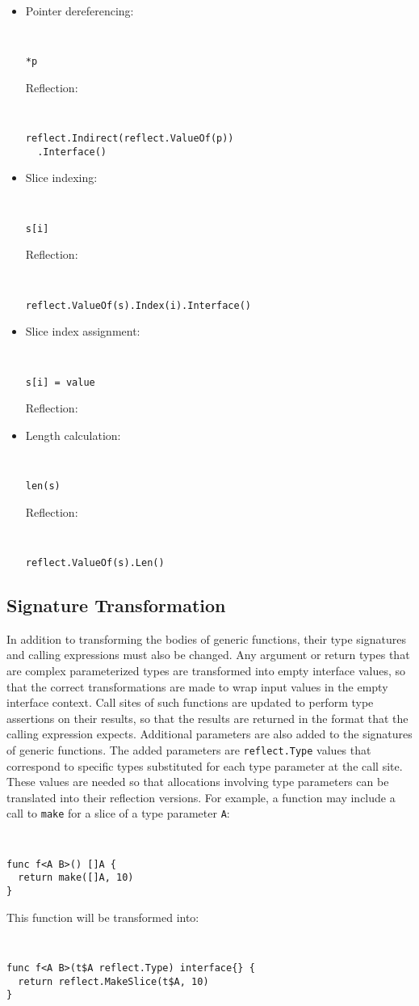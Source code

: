 \documentclass[letterpaper,11pt]{article}
\begin{document}
\begin{itemize}
\item
Pointer dereferencing:
{ \tt \small
\begin{verbatim}
*p
\end{verbatim}
}
Reflection:
{ \tt \small
\begin{verbatim}
reflect.Indirect(reflect.ValueOf(p))
  .Interface()
\end{verbatim}
}

\item
Slice indexing:
{ \tt \small
\begin{verbatim}
s[i]
\end{verbatim}
}
Reflection:
{ \tt \small
\begin{verbatim}
reflect.ValueOf(s).Index(i).Interface()
\end{verbatim}
}

\item
Slice index assignment:
{ \tt \small
\begin{verbatim}
s[i] = value
\end{verbatim}
}
Reflection:


\item
Length calculation:
{ \tt \small
\begin{verbatim}
len(s)
\end{verbatim}
}
Reflection:
{ \tt \small
\begin{verbatim}
reflect.ValueOf(s).Len()
\end{verbatim}
}

\end{itemize}


\subsection{Signature Transformation} \label{signaturetransformation}

In addition to transforming the bodies of generic functions, their type signatures and calling expressions must also be changed. Any argument or return types that are complex parameterized types are transformed into empty interface values, so that the correct transformations are made to wrap input values in the empty interface context. Call sites of such functions are updated to perform type assertions on their results, so that the results are returned in the format that the calling expression expects. Additional parameters are also added to the signatures of generic functions. The added parameters are \texttt{reflect.Type} values that correspond to specific types substituted for each type parameter at the call site. These values are needed so that allocations involving type parameters can be translated into their reflection versions. For example, a function may include a call to \texttt{make} for a slice of a type parameter \texttt{A}:
{ \tt \small
\begin{verbatim}
func f<A B>() []A {
  return make([]A, 10)
}
\end{verbatim} 
}
This function will be transformed into:
{ \tt \small
\begin{verbatim}
func f<A B>(t$A reflect.Type) interface{} {
  return reflect.MakeSlice(t$A, 10)
}
\end{verbatim} 
}
\end{document}
